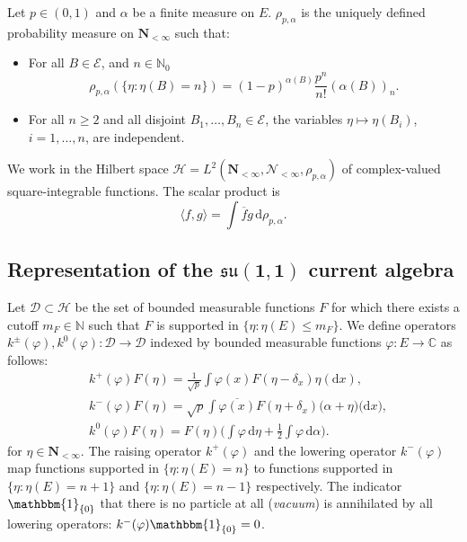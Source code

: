 \documentclass[11pt]{article}
\numberwithin{equation}{section}
\numberwithin{equation}{section}
\newcommand{\N}{\mathbb{N}}
\newcommand{\C}{\mathbb{C}}
\newcommand{\dd}{\mathrm{d}} %
\newcommand{\1}{\mathbbm{1}}
\begin{document}
\begin{Definition}
 Let $p\in (0,1)$ and $\alpha$ be a finite measure on $E$. $\rho_{p,\alpha}$ is the uniquely defined probability measure on $\mathbf N_{<\infty}$ such that:
 \begin{itemize}\itemsep=0pt
 	\item For all $B\in \mathcal E$, and $n\in \N_0$
 	\begin{equation} \label{eq:negbin}
 		\rho_{p,\alpha}(\{\eta\colon \eta(B) =n\}) = (1-p)^{\alpha(B)} \frac{p^n}{n!} (\alpha(B))_{n}.
 	\end{equation}
 	\item For all $n \geq 2$ and all disjoint $B_1,\ldots, B_n\in \mathcal E$, the variables $\eta\mapsto \eta(B_i)$, $i=1,\ldots, n$, are independent.
 \end{itemize}
\end{Definition}

We work in the Hilbert space $\mathcal H = L^2(\mathbf N_{<\infty}, \mathcal N_{<\infty}, \rho_{p,\alpha})$ of complex-valued square-integrable functions. The scalar product is
\[
	\langle f,g \rangle = \int \overline{f} g\, \dd\rho_{p,\alpha}.
\]

\subsection[Representation of the su(1,1)]{Representation of the $\boldsymbol{\mathfrak{su}(1,1)}$ current algebra} \label{sec:su11}

Let $\mathcal D\subset \mathcal H$ be the set of bounded measurable functions $F$ for which there exists a cutoff $ m_F \in \N$ such that $F$ is supported in $\{\eta\colon \eta(E)\leq m_F\}$. We define operators $k^\pm(\varphi),k^0(\varphi)\colon\mathcal D\to \mathcal D$ indexed by bounded measurable functions $\varphi\colon E\to \C$ as follows:
\begin{align*}
	&k^+(\varphi) F(\eta) = \frac{1}{\sqrt p} \int \varphi(x) F(\eta-\delta_x) \eta(\dd x),\\
 &k^-(\varphi) F(\eta) = \sqrt{p} \int \overline{\varphi(x)} F(\eta+\delta_x) \bigl(\alpha+\eta)\bigr(\dd x),\\
	&k^0(\varphi) F(\eta) = F(\eta) \biggl( \int \varphi\,\dd \eta+ \frac12 \int \varphi \,\dd \alpha \biggr).
\end{align*}
for $\eta \in \mathbf{N}_{<\infty}$.
The raising operator $k^+(\varphi)$ and the lowering operator $k^-(\varphi)$ map functions supported in $\{\eta\colon \eta(E) = n\}$ to functions supported in $\{\eta\colon \eta(E) =n+1\}$ and $\{\eta\colon \eta(E) =n-1\}$ respectively. The indicator $\1_{\{0\}}$ that there is no particle at all (\emph{vacuum}) is annihilated by all lowering operators: $k^-(\varphi) \1_{\{0\}}=0$.
\end{document}
